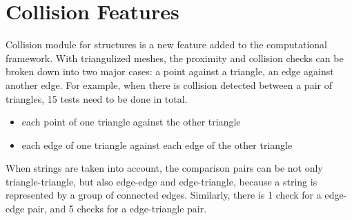 \section{Collision Features}
\label{Sec:CF}
Collision module for structures is a new feature added to the computational
framework.
With triangulized meshes, the proximity and collision checks can be broken
down into two major cases: a point against a triangle, an edge against
another edge.
For example, when there is collision detected between a pair of triangles,
15 tests need to be done in total.
\begin{itemize}
\item each point of one triangle against the other triangle
\item each edge of one triangle against each edge of the other triangle
\end{itemize}
When strings are taken into account, the comparison pairs can be not only
triangle-triangle, but also edge-edge and edge-triangle, because a string is
represented by a group of connected edges.
Similarly, there is 1 check for a edge-edge pair, and 5 checks for a
edge-triangle pair.

